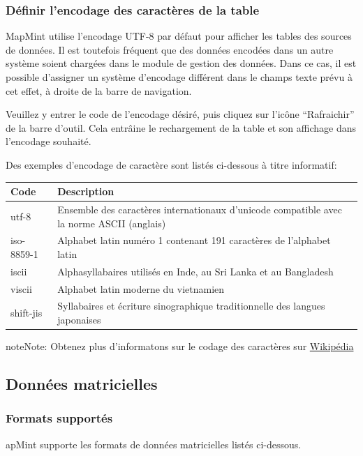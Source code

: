 \documentclass[letterpaper,10pt,french]{sphinxmanual}
\begin{document}
\subsubsection{Définir l'encodage des caractères de la table}
\label{data/datasources:definir-l-encodage-des-caracteres-de-la-table}
MapMint utilise l'encodage UTF-8 par défaut pour afficher les tables des sources de données. Il est toutefois fréquent que des données encodées dans un autre système soient chargées dans le module de gestion des données. Dans ce cas, il est possible d'assigner un système d'encodage différent dans le champs texte prévu à cet effet, à droite de la barre de navigation.

Veuillez y entrer le code de l'encodage désiré, puis cliquez sur l'icône ``Rafraichir'' de la barre d'outil. Cela entrâine le rechargement de la table et son affichage dans l'encodage souhaité.

Des exemples d'encodage de caractère sont listés ci-dessous à titre informatif:

\begin{tabulary}{\linewidth}{|L|L|}
\hline

\textbf{Code}
 & 
\textbf{Description}
\\
\hline
utf-8
 & 
Ensemble des caractères internationaux d'unicode compatible avec la norme ASCII (anglais)
\\
\hline
iso-8859-1
 & 
Alphabet latin numéro 1 contenant 191 caractères de l'alphabet latin
\\
\hline
iscii
 & 
Alphasyllabaires utilisés en Inde, au Sri Lanka et au Bangladesh
\\
\hline
viscii
 & 
Alphabet latin moderne du vietnamien
\\
\hline
shift-jis
 & 
Syllabaires et écriture sinographique traditionnelle des langues japonaises
\\
\hline\end{tabulary}


\begin{notice}{note}{Note:}
Obtenez plus d'informatons sur le codage des caractères sur \href{http://fr.wikipedia.org/wiki/Codage\_des\_caract\%C3\%A8res}{Wikipédia}
\end{notice}


\subsection{Données matricielles}
\label{data/datasources:donnees-matricielles}

\subsubsection{Formats supportés}
\label{data/datasources:id1}
apMint supporte les formats de données matricielles listés ci-dessous.
\end{document}
